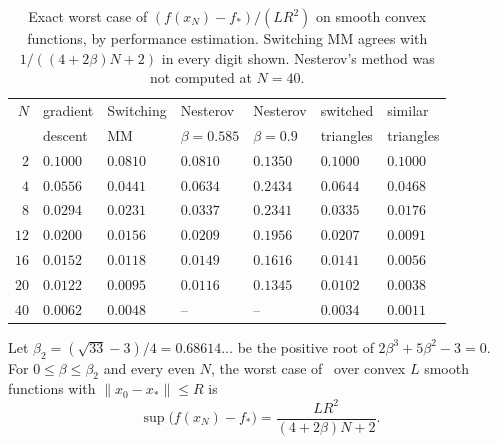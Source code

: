 \begin{table}[t]
\centering\small
\setlength{\tabcolsep}{3.5pt}
\caption{Exact worst case of $(f(x_N)-f_*)/(LR^2)$ on smooth convex functions,
by performance estimation. Switching MM agrees with $1/((4+2\beta)N+2)$ in
every digit shown. Nesterov's method was not computed at $N=40$.}
\label{tab:ch7b:pep}
\begin{tabular}{@{}rllllll@{}}
\toprule
$N$ & gradient & Switching & Nesterov & Nesterov & switched & similar \\
 & descent & MM & $\beta=0.585$ & $\beta=0.9$ & triangles & triangles \\
\midrule
$2$ & $0.1000$ & $0.0810$ & $0.0810$ & $0.1350$ & $0.1000$ & $0.1000$ \\
$4$ & $0.0556$ & $0.0441$ & $0.0634$ & $0.2434$ & $0.0644$ & $0.0468$ \\
$8$ & $0.0294$ & $0.0231$ & $0.0337$ & $0.2341$ & $0.0335$ & $0.0176$ \\
$12$ & $0.0200$ & $0.0156$ & $0.0209$ & $0.1956$ & $0.0207$ & $0.0091$ \\
$16$ & $0.0152$ & $0.0118$ & $0.0149$ & $0.1616$ & $0.0141$ & $0.0056$ \\
$20$ & $0.0122$ & $0.0095$ & $0.0116$ & $0.1345$ & $0.0102$ & $0.0038$ \\
$40$ & $0.0062$ & $0.0048$ & -- & -- & $0.0034$ & $0.0011$ \\
\bottomrule
\end{tabular}
\end{table}

\begin{conjecture}\label{conj:ch7b:tight}
Let $\beta_2=(\sqrt{33}-3)/4=0.68614\ldots$ be the positive root of $2\beta^3+5\beta^2-3=0$. For
$0\le\beta\le\beta_2$ and every even $N$, the worst case of \smmdet\ over
convex $L$ smooth functions with $\|x_0-x_*\|\le R$ is
\[
  \sup\bigl(f(x_N)-f_*\bigr)=\frac{LR^2}{(4+2\beta)N+2}.
\]
\end{conjecture}

